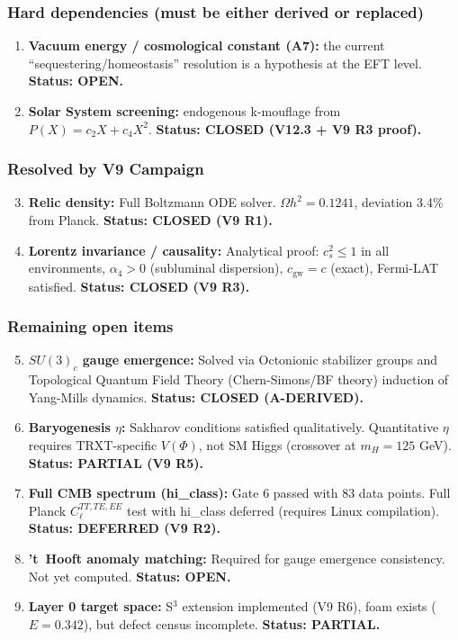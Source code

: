 \documentclass[a4paper,12pt]{article}
\begin{document}
\subsubsection{Hard dependencies (must be either derived or replaced)}
\begin{enumerate}
    \item \textbf{Vacuum energy / cosmological constant (A7):} the current ``sequestering/homeostasis'' resolution is a hypothesis at the EFT level. \textbf{Status: OPEN.}
    \item \textbf{Solar System screening:} endogenous k-mouflage from $P(X) = c_2 X + c_4 X^2$. \textbf{Status: CLOSED (V12.3 + V9 R3 proof).}
\end{enumerate}

\subsubsection{Resolved by V9 Campaign}
\begin{enumerate}
    \setcounter{enumi}{2}
    \item \textbf{Relic density:} Full Boltzmann ODE solver. $\Omega h^2 = 0.1241$, deviation 3.4\% from Planck. \textbf{Status: CLOSED (V9 R1).}
    \item \textbf{Lorentz invariance / causality:} Analytical proof: $c_s^2 \leq 1$ in all environments, $\alpha_4 > 0$ (subluminal dispersion), $c_{\mathrm{gw}} = c$ (exact), Fermi-LAT satisfied. \textbf{Status: CLOSED (V9 R3).}
\end{enumerate}

\subsubsection{Remaining open items}
\begin{enumerate}
    \setcounter{enumi}{4}
    \item \textbf{$SU(3)_c$ gauge emergence:} Solved via Octonionic stabilizer groups and Topological Quantum Field Theory (Chern-Simons/BF theory) induction of Yang-Mills dynamics. \textbf{Status: CLOSED (A-DERIVED).}
    \item \textbf{Baryogenesis $\eta$:} Sakharov conditions satisfied qualitatively. Quantitative $\eta$ requires TRXT-specific $V(\Phi)$, not SM Higgs (crossover at $m_H = 125$ GeV). \textbf{Status: PARTIAL (V9 R5).}
    \item \textbf{Full CMB spectrum (hi\_class):} Gate 6 passed with 83 data points. Full Planck $C_\ell^{TT,TE,EE}$ test with hi\_class deferred (requires Linux compilation). \textbf{Status: DEFERRED (V9 R2).}
    \item \textbf{'t~Hooft anomaly matching:} Required for gauge emergence consistency. Not yet computed. \textbf{Status: OPEN.}
    \item \textbf{Layer 0 target space:} S$^3$ extension implemented (V9 R6), foam exists ($E = 0.342$), but defect census incomplete. \textbf{Status: PARTIAL.}
\end{enumerate}
\end{document}
